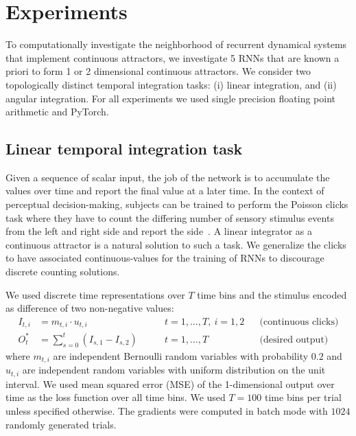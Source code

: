 \documentclass{article} %
\newcounter{ct}
\theoremstyle{definition}
\theoremstyle{remark}
\renewcommand{\cite}{\citep}
\begin{document}
\section{Experiments}
To computationally investigate the neighborhood of recurrent dynamical systems that implement continuous attractors, we investigate 5 RNNs that are known a priori to form 1 or 2 dimensional continuous attractors.
We consider two topologically distinct temporal integration tasks: (i) linear integration, and (ii) angular integration.
For all experiments we used single precision floating point arithmetic and PyTorch.
%
\subsection{Linear temporal integration task}\label{sec:task:continuous-clicks}
Given a sequence of scalar input, the job of the network is to accumulate the values over time and report the final value at a later time.
In the context of perceptual decision-making, subjects can be trained to perform the Poisson clicks task where they have to count the differing number of sensory stimulus events from the left and right side and report the side~\cite{brunton2013}.
A linear integrator as a continuous attractor is a natural solution to such a task.
We generalize the clicks to have associated continuous-values for the training of RNNs to discourage discrete counting solutions.

We used discrete time representations over $T$ time bins and the stimulus encoded as difference of two non-negative values:
\begin{align}
    I_{t,i} &= m_{t,i} \cdot u_{t,i} 
             \qquad & t=1,\dots, T, \ i=1,2 &&\text{(continuous clicks)}	\label{eq:input}
    \\
    O^\ast_{t} &= \sum_{s=0}^{t} \left(
        I_{s,1} - I_{s,2}
        \right)
            \qquad  & t=1,\dots, T &&  \text{(desired output)} 			\label{eq:output}
\end{align}
where $m_{t,i}$ are independent Bernoulli random variables with probability $0.2$ and $u_{t,i}$ are independent random variables with uniform distribution on the unit interval.
We used mean squared error (MSE) of the 1-dimensional output over time as the loss function over all time bins.
We used $T=100$ time bins per trial unless specified otherwise.
The gradients were computed in batch mode with $1024$ randomly generated trials.
\end{document}
